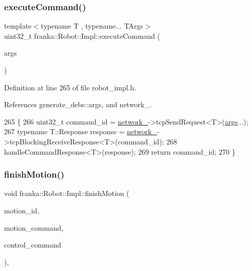 \subsubsection{\texorpdfstring{execute\+Command()}{executeCommand()}}
{\footnotesize\ttfamily template$<$typename T , typename... T\+Args$>$ \\
uint32\+\_\+t franka\+::\+Robot\+::\+Impl\+::execute\+Command (\begin{DoxyParamCaption}\item[{T\+Args...}]{args }\end{DoxyParamCaption})}



Definition at line 265 of file robot\+\_\+impl.\+h.



References generate\+\_\+debs\+::args, and network\+\_\+.


\begin{DoxyCode}
265                                                 \{
266   uint32\_t command\_id = \hyperlink{classfranka_1_1Robot_1_1Impl_acecf3b158ccd1c2ed7e76971f1e6a192}{network\_}->tcpSendRequest<T>(\hyperlink{namespacegenerate__debs_a75f9143e38df82d83b2e8a6f99cae02c}{args}...);
267   \textcolor{keyword}{typename} T::Response response = \hyperlink{classfranka_1_1Robot_1_1Impl_acecf3b158ccd1c2ed7e76971f1e6a192}{network\_}->tcpBlockingReceiveResponse<T>(command\_id);
268   handleCommandResponse<T>(response);
269   \textcolor{keywordflow}{return} command\_id;
270 \}
\end{DoxyCode}
\mbox{\label{classfranka_1_1Robot_1_1Impl_a024cc4b7994e164a1468b4dd222f80ab}} 
\subsubsection{\texorpdfstring{finish\+Motion()}{finishMotion()}}
{\footnotesize\ttfamily void franka\+::\+Robot\+::\+Impl\+::finish\+Motion (\begin{DoxyParamCaption}\item[{uint32\+\_\+t}]{motion\+\_\+id,  }\item[{const \hyperlink{structresearch__interface_1_1robot_1_1MotionGeneratorCommand}{research\+\_\+interface\+::robot\+::\+Motion\+Generator\+Command} $\ast$}]{motion\+\_\+command,  }\item[{const \hyperlink{structresearch__interface_1_1robot_1_1ControllerCommand}{research\+\_\+interface\+::robot\+::\+Controller\+Command} $\ast$}]{control\+\_\+command }\end{DoxyParamCaption})\hspace{0.3cm}{\ttfamily [override]}, {\ttfamily [virtual]}}



